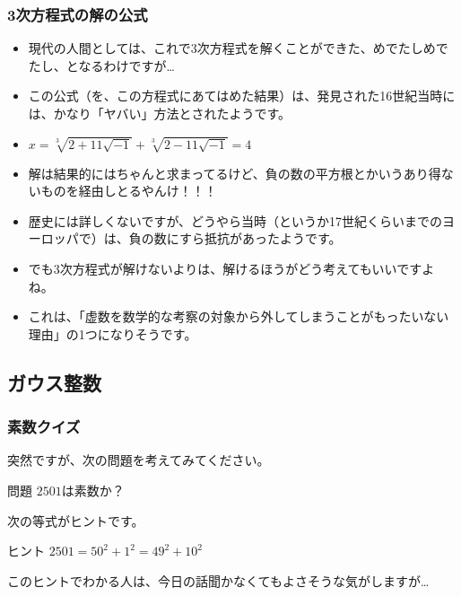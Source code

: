 \documentclass[dvipdfmx]{beamer}
\begin{document}
  \begin{frame}
    \frametitle{3次方程式の解の公式}

    \begin{itemize}
      \item 現代の人間としては、これで3次方程式を解くことができた、めでたしめでたし、となるわけですが…
      \item この公式（を、この方程式にあてはめた結果）は、発見された16世紀当時には、かなり「ヤバい」方法とされたようです。
      \item $x = \sqrt[3]{2 + 11\sqrt{-1}} + \sqrt[3]{2 - 11\sqrt{-1}} = 4$

      \pause

      \item 解は結果的にはちゃんと求まってるけど、\alert{負の数の平方根とかいうあり得ないもの}を経由しとるやんけ！！！

      \pause

      \item 歴史には詳しくないですが、どうやら当時（というか17世紀くらいまでのヨーロッパで）は、負の数にすら抵抗があったようです。
      \item でも3次方程式が解けないよりは、解けるほうがどう考えてもいいですよね。
      \item これは、「虚数を数学的な考察の対象から外してしまうことがもったいない理由」の1つになりそうです。
    \end{itemize}

  \end{frame}

  \subsection{ガウス整数}

  \begin{frame}
    \frametitle{素数クイズ}

    突然ですが、次の問題を考えてみてください。
    \begin{block}{問題}
      $2501$は素数か？
    \end{block}

    \pause

    次の等式がヒントです。
    \begin{block}{ヒント}
      $2501 = 50^2 + 1^2 = 49^2 + 10^2$
    \end{block}
    このヒントでわかる人は、今日の話聞かなくてもよさそうな気がしますが…

  \end{frame}
\end{document}
